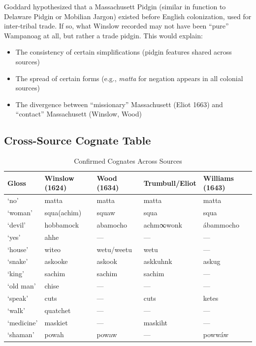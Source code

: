 Goddard hypothesized that a Massachusett Pidgin (similar in function to Delaware
Pidgin or Mobilian Jargon) existed before English colonization, used for
inter-tribal trade. If so, what Winslow recorded may not have been ``pure''
Wampanoag at all, but rather a trade pidgin. This would explain:

\begin{itemize}
  \item The consistency of certain simplifications (pidgin features shared
    across sources)
  \item The spread of certain forms (e.g., \emph{matta} for negation appears in
    all colonial sources)
  \item The divergence between ``missionary'' Massachusett (Eliot 1663) and
    ``contact'' Massachusett (Winslow, Wood)
\end{itemize}

\subsection{Cross-Source Cognate Table}

\begin{table}[htbp]
\centering
\caption{Confirmed Cognates Across Sources}
\label{tab:1366-cognates}
\begin{tabular}{lllll}
\hline
Gloss & Winslow (1624) & Wood (1634) & Trumbull/Eliot & Williams (1643) \\
\hline
`no' & matta & matta & matta & matta \\
`woman' & squa(achim) & squaw & squa & squa \\
`devil' & hobbamock & abamocho & achm∞wonk & ábammocho \\
`yes' & ahhe & --- & --- & --- \\
`house' & witeo & wetu/weetu & wetu & --- \\
`snake' & askooke & askook & askkuhnk & askug \\
`king' & sachim & sachim & sachim & --- \\
`old man' & chise & --- & --- & --- \\
`speak' & cuts & --- & cuts & ketes \\
`walk' & quatchet & --- & --- & --- \\
`medicine' & maskiet & --- & maskiht & --- \\
`shaman' & powah & powaw & --- & powwáw \\
\hline
\end{tabular}
\end{table}

